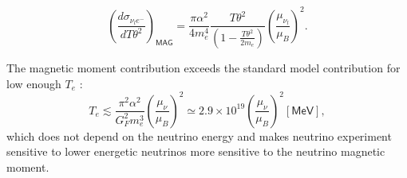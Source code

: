 \begin{equation}
\left(\frac{d\sigma_{\nu_le^-}}{dT\theta^2}\right)_{\textsf{MAG}}=\frac{\pi\alpha^2}{4m_e^4}\frac{T\theta^2}{\left(1-\frac{T\theta^2}{2m_e}\right)}\left(\frac{\mu_{\nu_l}}{\mu_B}\right)^2.
\end{equation}

The magnetic moment contribution exceeds the standard model contribution for low enough $T_e$ \cite{nuElmagInt2015.pdf}:
\begin{equation}
T_e\lesssim\frac{\pi^2\alpha^2}{G_F^2m_e^3}\left(\frac{\mu_{\nu}}{\mu_B}\right)^2\simeq 2.9\times 10^{19}\left(\frac{\mu_{\nu}}{\mu_B}\right)^2\left[\textsf{MeV}\right],
\end{equation}
which does not depend on the neutrino energy and makes neutrino experiment sensitive to lower energetic neutrinos more sensitive to the neutrino magnetic moment.

